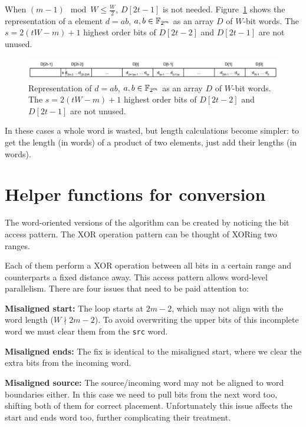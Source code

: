 When $(m-1) \mod{W} \leq \frac{W}{2}$, $D[2t-1]$ is not needed.  Figure~\ref{fig:elemento:field:mult2} shows the representation of a element $d = ab$, $a,b \in {\mathbb F}_{2^m}$ as an array $D$ of $W$-bit words. The $s = 2(tW-m)+1$ highest order bits of $D[2t-2]$ and $D[2t-1]$ are not unused.
\begin{figure}
  \centering
  \includegraphics[width = \columnwidth]{figures/two-word-element-2.pdf}
\caption{Representation of $d = ab$, $a,b \in {\mathbb F}_{2^m}$ as an array $D$ of $W$-bit words. The $s = 2(tW-m)+1$ highest order bits of $D[2t-2]$ and $D[2t-1]$ are not unused.}
\label{fig:elemento:field:mult2}
\end{figure}

In these cases a whole word is wasted, but length calculations become simpler: to get the length (in words) of a product of two elements, just add their lengths (in words).


\section{Helper functions for conversion} \label{helper-functions}

The word-oriented versions of the algorithm can be created by noticing the bit access pattern. The XOR operation pattern can be thought of XORing two ranges.

Each of them perform a XOR operation between all bits in a certain range and counterparts a fixed distance away. This access pattern allows word-level parallelism. There are four issues that need to be paid attention to:

\textbf{Misaligned start:}
The loop starts at $2m -2$, which may not align with the word length ($W \nmid 2m-2$). To avoid overwriting the upper bits of this incomplete word we must clear them from the \texttt{src} word.

\textbf{Misaligned ends:}
The fix is identical to the misaligned start, where we clear the extra bits from the incoming word.

\textbf{Misaligned source:}
The source/incoming word may not be aligned to word boundaries either. In this case we need to pull bits from the next word too, shifting both of them for correct placement. Unfortunately this issue affects the start and ends word too, further complicating their treatment.

